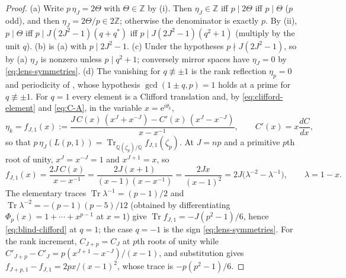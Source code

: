 \documentclass[11pt]{article}
\theoremstyle{definition}
\DeclareMathOperator{\Tr}{Tr}
\newcommand{\Z}{\mathbb Z}
\newcommand{\Q}{\mathbb Q}
\newcommand{\e}{\mathrm e}
\begin{document}
\begin{proof}
(a) Write $p\,\eta_J=2\Theta$ with $\Theta\in\Z$ by (i).  Then
$\eta_J\in\Z$ iff $p\mid2\Theta$ iff $p\mid\Theta$ ($p$ odd), and then
$\eta_J=2\Theta/p\in2\Z$; otherwise the denominator is exactly $p$.  By
(ii), $p\mid\Theta$ iff $p\mid J(2J^2-1)(q+q^*)$ iff
$p\mid J(2J^2-1)(q^2+1)$ (multiply by the unit $q$).  (b) is (a) with
$p\mid2J^2-1$.  (c) Under the hypotheses $p\nmid J(2J^2-1)$, so by (a)
$\eta_J$ is nonzero unless $p\mid q^2+1$; conversely mirror spaces have
$\eta_J=0$ by \eqref{eq:lens-symmetries}.  (d) The vanishing for
$q\not\equiv\pm1$ is the rank reflection $\eta_p=0$ and periodicity of
\cite[Thm.~6.2]{MahmoodP1Collection2026}, whose hypothesis
$\gcd(1\pm q,p)=1$ holds at a prime for $q\not\equiv\pm1$.  For $q=1$
every element is a Clifford translation and, by
\eqref{eq:clifford-element} and \eqref{eq:C-A}, in the variable
$x=\e^{i\theta_k}$,
\[
 \eta_k=f_{J,1}(x)
 :=\frac{J\,C(x)\,(x^J+x^{-J})-C'(x)\,(x^J-x^{-J})}{x-x^{-1}},
 \qquad C'(x)=x\frac{dC}{dx},
\]
so that $p\,\eta_J(L(p,1))=\Tr_{\Q(\zeta_p)/\Q}f_{J,1}(\zeta_p)$.  At
$J=np$ and a primitive $p$th root of unity, $x^J=x^{-J}=1$ and
$x^{J+1}=x$, so
\[
 f_{J,1}(x)=\frac{2J\,C(x)}{x-x^{-1}}
 =\frac{2J(x+1)}{(x-1)(x-x^{-1})}=\frac{2Jx}{(x-1)^2}
 =2J\bigl(\lambda^{-2}-\lambda^{-1}\bigr),\qquad\lambda=1-x .
\]
The elementary traces $\Tr\lambda^{-1}=(p-1)/2$ and
$\Tr\lambda^{-2}=-(p-1)(p-5)/12$ (obtained by differentiating
$\Phi_p(x)=1+\cdots+x^{p-1}$ at $x=1$) give
$\Tr f_{J,1}=-J(p^2-1)/6$, hence \eqref{eq:blind-clifford} at $q=1$; the
case $q=-1$ is the sign \eqref{eq:lens-symmetries}.  For the rank
increment, $C_{J+p}=C_J$ at $p$th roots of unity while
$C'_{J+p}-C'_J=p(x^{J+1}-x^{-J})/(x-1)$, and substitution gives
$f_{J+p,1}-f_{J,1}=2px/(x-1)^2$, whose trace is $-p(p^2-1)/6$.
\end{proof}
\end{document}
